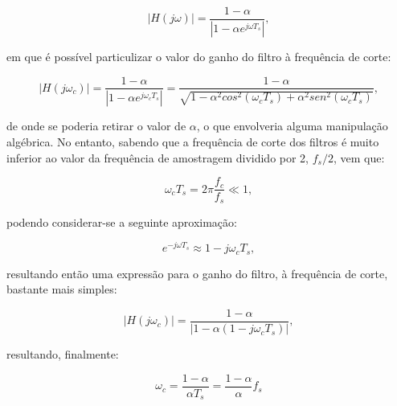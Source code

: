 \documentclass[11pt]{article}
\numberwithin{equation}{section}
\begin{document}
\vspace{-3mm}
\begin{equation}
	|H(j\omega)| = \frac{1-\alpha}{|1-\alpha e^{j\omega T_s}|},
\end{equation} 

\vspace{1mm}
em que é possível particulizar o valor do ganho do filtro à frequência de corte:

\vspace{-3mm}
\begin{equation}
	|H(j\omega_c)| = \frac{1-\alpha}{|1-\alpha e^{j\omega_c T_s}|} = \frac{1 - \alpha}{\sqrt{1- \alpha^2 cos^2{(\omega_c T_s)} + \alpha^2 sen^2{(\omega_c T_s)}}},
\end{equation} 

\vspace{1mm}
de onde se poderia retirar o valor de $\alpha$, o que envolveria alguma manipulação algébrica. No entanto, sabendo que a frequência de corte dos filtros é muito inferior ao valor da frequência de amostragem dividido por 2, $f_s/2$, vem que:

\vspace{-3mm}
\begin{equation}
\omega_ c T_s = 2\pi \frac{f_c}{f_s} \ll 1,
\end{equation} 

\vspace{1mm}
podendo considerar-se a seguinte aproximação:

\vspace{-3mm}
\begin{equation}
e^{-j\omega T_s} \approx 1 - j\omega_c T_s,
\end{equation} 

\vspace{1mm}
resultando então uma expressão para o ganho do filtro, à frequência de corte, bastante mais simples:

\vspace{-3mm}
\begin{equation}
|H(j\omega_c)| =  \frac{1 - \alpha}{|1-\alpha(1-j\omega_c T_s)|},
\end{equation} 

\vspace{1mm}
resultando, finalmente:

\vspace{-3mm}
\begin{equation}
\omega_c = \frac{1 - \alpha}{\alpha T_s} = \frac{1 - \alpha}{\alpha} f_s
\end{equation} 
\end{document}
